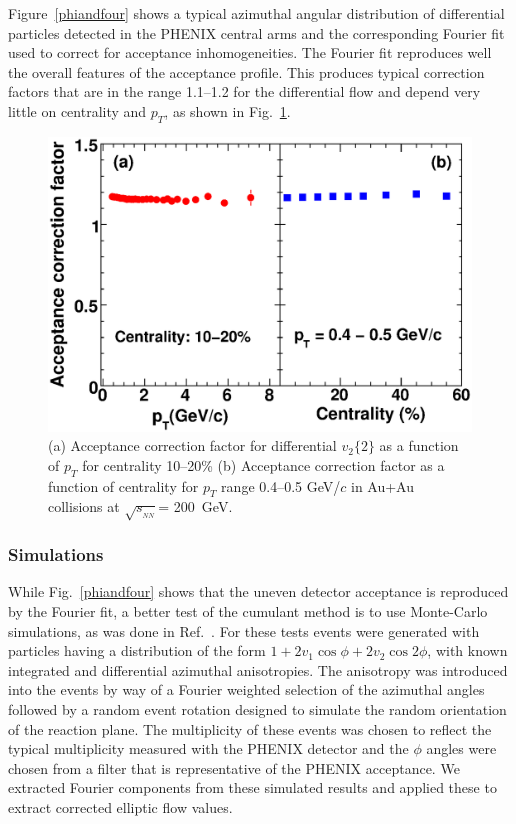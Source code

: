 \documentclass[aps,prc,superscriptaddress,showpacs,floatfix,twocolumn]{revtex4}
\newcommand \pt{\mbox{$p_T$}\xspace}
\newcommand \sqsn{\mbox{$\sqrt{s_{_{NN}}}$}\xspace}
\newcommand \Fig{Fig.\xspace}
\newcommand \Au{{Au+Au}\xspace}
\begin{document}
Figure~\ref{phiandfour} shows a typical azimuthal angular distribution of 
differential particles detected in the PHENIX central arms and the 
corresponding Fourier fit used to correct for acceptance inhomogeneities. 
The Fourier fit reproduces well the overall features of the acceptance 
profile. This produces typical correction factors that are in the range 
1.1--1.2 for the differential flow and depend very little on centrality 
and \pt, as shown in Fig.~\ref{corrfac}.

\begin{figure}[hbt]
\includegraphics[width=1.0\linewidth]{acceptancecorr.eps}
\caption{\label{corrfac} (a) Acceptance correction factor for 
differential $v_2\{2\}$ as a function of \pt for centrality 
10--20\% (b) Acceptance correction factor as a function of 
centrality for \pt range 0.4--0.5 GeV/$c$ in \Au collisions at 
\sqsn = 200~GeV.}
\end{figure}


\subsubsection{Simulations}

While \Fig~\ref{phiandfour} shows that the uneven detector acceptance is 
reproduced by the Fourier fit, a better test of the cumulant method is to 
use Monte-Carlo simulations, as was done in Ref.~\cite{Borghini:2001vi}.  
For these tests events were generated with particles having a distribution 
of the form $1 + 2v_1\cos{\phi} + 2v_2\cos{2\phi}$, with known integrated 
and differential azimuthal anisotropies. The anisotropy was introduced 
into the events by way of a Fourier weighted selection of the azimuthal 
angles followed by a random event rotation designed to simulate the random 
orientation of the reaction plane. The multiplicity of these events was 
chosen to reflect the typical multiplicity measured with the PHENIX 
detector and the $\phi$ angles were chosen from a filter that is 
representative of the PHENIX acceptance. We extracted Fourier components 
from these simulated results and applied these to extract corrected 
elliptic flow values.
\end{document}
